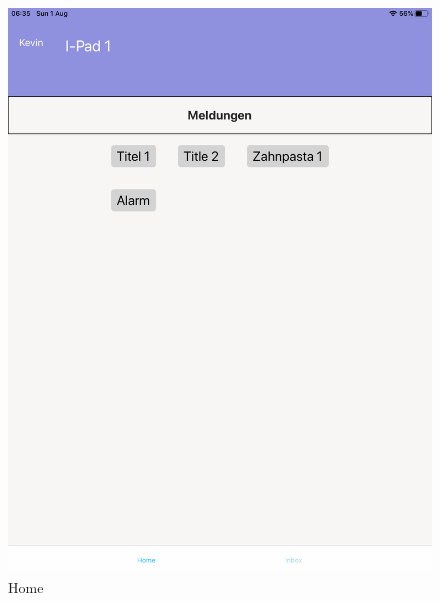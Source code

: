 \begin{figure}[h]
    \centering
    \begin{minipage}[b]{0.4\textwidth}
        \includegraphics[width=\textwidth]{graphics/screenshots/mobileclient/screenshot-homescreen}
        \caption{Home}
    \end{minipage}
    \hfill
    \begin{minipage}[b]{0.4\textwidth}

\end{minipage}
\end{figure}
